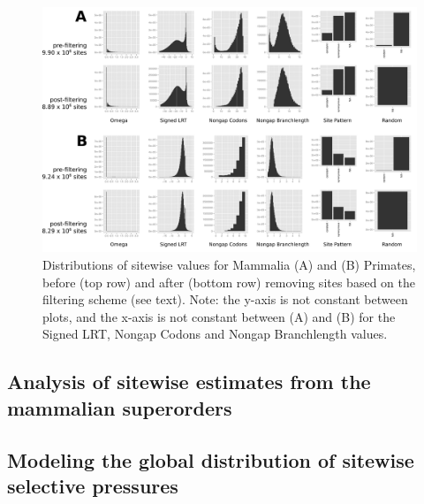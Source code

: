 \begin{landscape}
\begin{figure}[ht]
\centering
\includegraphics[scale=0.42]{Figs/qc_hist_mammals_primates.pdf}
\caption{Distributions of sitewise values for Mammalia (A) and (B)
  Primates, before (top row) and after (bottom row) removing sites
  based on the filtering scheme (see text). Note: the y-axis is not
  constant between plots, and the x-axis is not constant between (A)
  and (B) for the Signed LRT, Nongap Codons and Nongap Branchlength
  values.}
\label{qc_hist_mammals_primates}
\end{figure}
\end{landscape}




\subsection{Analysis of sitewise estimates from the mammalian superorders}




\subsection{Modeling the global distribution of sitewise selective pressures}



